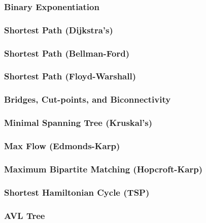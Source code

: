 \subsubsection*{Binary Exponentiation}

\subsubsection*{Shortest Path (Dijkstra's)}

\subsubsection*{Shortest Path (Bellman-Ford)}

\subsubsection*{Shortest Path (Floyd-Warshall)}

\subsubsection*{Bridges, Cut-points, and Biconnectivity}

\subsubsection*{Minimal Spanning Tree (Kruskal's)}

\subsubsection*{Max Flow (Edmonds-Karp)}

\subsubsection*{Maximum Bipartite Matching (Hopcroft-Karp)}

\subsubsection*{Shortest Hamiltonian Cycle (TSP)}

\subsubsection*{AVL Tree}

